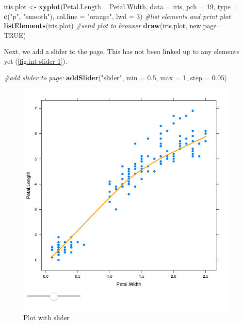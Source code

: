 \documentclass[11pt,]{report}
\newenvironment{Shaded}{\begin{snugshade}}{\end{snugshade}}
\newcommand{\KeywordTok}[1]{\textcolor[rgb]{0.13,0.29,0.53}{\textbf{#1}}}
\newcommand{\DataTypeTok}[1]{\textcolor[rgb]{0.13,0.29,0.53}{#1}}
\newcommand{\DecValTok}[1]{\textcolor[rgb]{0.00,0.00,0.81}{#1}}
\newcommand{\FloatTok}[1]{\textcolor[rgb]{0.00,0.00,0.81}{#1}}
\newcommand{\StringTok}[1]{\textcolor[rgb]{0.31,0.60,0.02}{#1}}
\newcommand{\CommentTok}[1]{\textcolor[rgb]{0.56,0.35,0.01}{\textit{#1}}}
\newcommand{\OtherTok}[1]{\textcolor[rgb]{0.56,0.35,0.01}{#1}}
\newcommand{\OperatorTok}[1]{\textcolor[rgb]{0.81,0.36,0.00}{\textbf{#1}}}
\newcommand{\NormalTok}[1]{#1}
\begin{document}
\begin{Shaded}
\begin{Highlighting}[]
\NormalTok{iris.plot <-}\StringTok{ }\KeywordTok{xyplot}\NormalTok{(Petal.Length }\OperatorTok{~}\StringTok{ }\NormalTok{Petal.Width,}
                    \DataTypeTok{data =}\NormalTok{ iris,}
                    \DataTypeTok{pch =} \DecValTok{19}\NormalTok{,}
                    \DataTypeTok{type =} \KeywordTok{c}\NormalTok{(}\StringTok{"p"}\NormalTok{, }\StringTok{"smooth"}\NormalTok{),}
                    \DataTypeTok{col.line =} \StringTok{"orange"}\NormalTok{, }\DataTypeTok{lwd =} \DecValTok{3}\NormalTok{)}
\CommentTok{#list elements and print plot}
\KeywordTok{listElements}\NormalTok{(iris.plot)}
\CommentTok{#send plot to browser}
\KeywordTok{draw}\NormalTok{(iris.plot, }\DataTypeTok{new.page =} \OtherTok{TRUE}\NormalTok{)}
\end{Highlighting}
\end{Shaded}

Next, we add a slider to the page. This has not been linked up to any
elements yet (\autoref{fig:int-slider-1}).

\begin{Shaded}
\begin{Highlighting}[]
\CommentTok{#add slider to page:}
\KeywordTok{addSlider}\NormalTok{(}\StringTok{"slider"}\NormalTok{, }\DataTypeTok{min =} \FloatTok{0.5}\NormalTok{, }\DataTypeTok{max =} \DecValTok{1}\NormalTok{, }\DataTypeTok{step =} \FloatTok{0.05}\NormalTok{)}
\end{Highlighting}
\end{Shaded}

\begin{figure}[H]

{\centering \includegraphics[width=0.7\linewidth,]{./fig/int-slider-1} 

}

\caption{\label{fig:int-slider-1} Plot with slider}\label{fig:unnamed-chunk-69}
\end{figure}
\end{document}
